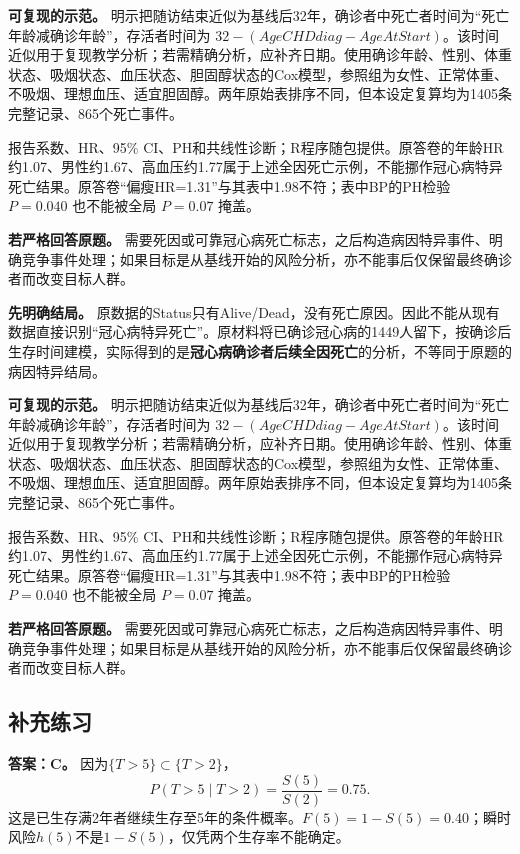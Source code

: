 \textbf{可复现的示范。} 明示把随访结束近似为基线后32年，确诊者中死亡者时间为``死亡年龄减确诊年龄''，存活者时间为 \(32-(AgeCHDdiag-AgeAtStart)\)。该时间近似用于复现教学分析；若需精确分析，应补齐日期。使用确诊年龄、性别、体重状态、吸烟状态、血压状态、胆固醇状态的Cox模型，参照组为女性、正常体重、不吸烟、理想血压、适宜胆固醇。两年原始表排序不同，但本设定复算均为1405条完整记录、865个死亡事件。

报告系数、HR、95\% CI、PH和共线性诊断；R程序随包提供。原答卷的年龄HR约1.07、男性约1.67、高血压约1.77属于上述全因死亡示例，不能挪作冠心病特异死亡结果。原答卷``偏瘦HR=1.31''与其表中1.98不符；表中BP的PH检验 \(P=0.040\) 也不能被全局 \(P=0.07\) 掩盖。

\textbf{若严格回答原题。} 需要死因或可靠冠心病死亡标志，之后构造病因特异事件、明确竞争事件处理；如果目标是从基线开始的风险分析，亦不能事后仅保留最终确诊者而改变目标人群。



\textbf{先明确结局。} 原数据的Status只有Alive/Dead，没有死亡原因。因此不能从现有数据直接识别``冠心病特异死亡''。原材料将已确诊冠心病的1449人留下，按确诊后生存时间建模，实际得到的是\textbf{冠心病确诊者后续全因死亡}的分析，不等同于原题的病因特异结局。

\textbf{可复现的示范。} 明示把随访结束近似为基线后32年，确诊者中死亡者时间为``死亡年龄减确诊年龄''，存活者时间为 \(32-(AgeCHDdiag-AgeAtStart)\)。该时间近似用于复现教学分析；若需精确分析，应补齐日期。使用确诊年龄、性别、体重状态、吸烟状态、血压状态、胆固醇状态的Cox模型，参照组为女性、正常体重、不吸烟、理想血压、适宜胆固醇。两年原始表排序不同，但本设定复算均为1405条完整记录、865个死亡事件。

报告系数、HR、95\% CI、PH和共线性诊断；R程序随包提供。原答卷的年龄HR约1.07、男性约1.67、高血压约1.77属于上述全因死亡示例，不能挪作冠心病特异死亡结果。原答卷``偏瘦HR=1.31''与其表中1.98不符；表中BP的PH检验 \(P=0.040\) 也不能被全局 \(P=0.07\) 掩盖。

\textbf{若严格回答原题。} 需要死因或可靠冠心病死亡标志，之后构造病因特异事件、明确竞争事件处理；如果目标是从基线开始的风险分析，亦不能事后仅保留最终确诊者而改变目标人群。


\subsection{补充练习}


\textbf{答案：C。} 因为\(\{T>5\}\subset\{T>2\}\)，
\[P(T>5\mid T>2)=\frac{S(5)}{S(2)}=0.75.\]
这是已生存满2年者继续生存至5年的条件概率。\(F(5)=1-S(5)=0.40\)；瞬时风险\(h(5)\)不是\(1-S(5)\)，仅凭两个生存率不能确定。



